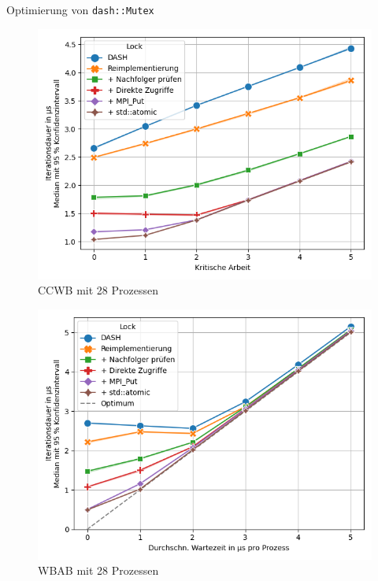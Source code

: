 \documentclass[fleqn,compress,utf8,aspectratio=169,t]{beamer}
\begin{document}
\begin{frame}{Optimierung von \texttt{dash::Mutex}}
    \begin{minipage}{.49\textwidth}
        \begin{figure}
            \includegraphics[width=\textwidth]{../../Dokumentation/Latex/Bilder/benchmarks/intelmpi/dash-optimization/CCWB-processes=28-latency}
            \caption{CCWB mit 28 Prozessen}
        \end{figure}
    \end{minipage}
    \begin{minipage}{.49\textwidth}
        \begin{figure}
            \includegraphics[width=\textwidth]{../../Dokumentation/Latex/Bilder/benchmarks/intelmpi/dash-optimization/WBAB-processes=28,mpi_progress=1-latency}
            \caption{WBAB mit 28 Prozessen}
        \end{figure}
    \end{minipage}
\end{frame}
\end{document}

